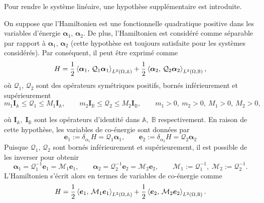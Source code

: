 Pour rendre le système linéaire, une hypothèse supplémentaire est introduite.
\begin{hypothese}\label{ass:quadHam_fr}
On suppose que l'Hamiltonien est une fonctionnelle quadratique positive dans les variables d'énergie $\bm{\alpha}_1, \, \bm{\alpha}_2 $. De plus, l'Hamiltonien est considéré comme séparable par rapport à $\bm{\alpha}_1, \, \bm{\alpha}_2 $ (cette hypothèse est toujours satisfaite pour les systèmes considérés). Par conséquent, il peut être exprimé comme
\begin{equation*}
H = \frac{1}{2} \inner[L^2(\Omega, \mathbb{A})]{\bm{\alpha}_{1}}{\mathcal{Q}_1\bm{\alpha}_{1}} + \frac{1}{2} \inner[L^2(\Omega, \mathbb{B})]{\bm{\alpha}_{2}}{\mathcal{Q}_2\bm{\alpha}_{2}},
\end{equation*}
où $ \mathcal{Q}_1, \, \mathcal{Q}_2 $ sont des opérateurs symétriques positifs, bornés inférieurement et supérieurement
\begin{equation*}
m_1 \bm{I}_\mathbb{A} \le\mathcal{Q}_1 \le M_1 \bm{I}_\mathbb{A}, \qquad  m_2 \bm{I}_\mathbb{B} \le \mathcal{Q}_2 \le M_2 \bm{I}_\mathbb{B}, \qquad m_1>0, \ m_2>0, \ M_1>0, \ M_2>0,
\end{equation*} 
\end{hypothese}
où $\bm{I}_\mathbb{A}, \; \bm{I}_\mathbb{B}$ sont les opérateurs d'identité dans $\mathbb{A}, \; \mathbb{B}$ respectivement. En raison de cette hypothèse, les variables de co-énergie sont données par
\begin{equation*}
\bm{e}_1 := \delta_{\alpha_1} H = \mathcal{Q}_1 \bm{\alpha}_1, \qquad \bm{e}_2 := \delta_{\alpha_2} H = \mathcal{Q}_2 \bm{\alpha}_2
\end{equation*}
Puisque $\mathcal{Q}_1, \, \mathcal{Q}_2 $ sont bornés inférieurement et supérieurement, il est possible de les inverser pour obtenir
\begin{equation*}
\bm{\alpha}_1 = \mathcal{Q}_1^{-1}\bm{e}_1 = \mathcal{M}_1\bm{e}_1, \qquad  \bm{\alpha}_2 = \mathcal{Q}_2^{-1} \bm{e}_2 = \mathcal{M}_2 \bm{e}_2, \qquad \mathcal{M}_1 := \mathcal{Q}_1^{-1}, \; \mathcal{M}_2 := \mathcal{Q}_2^{-1}.
\end{equation*}
L'Hamiltonien s'écrit alors en termes de variables de co-énergie comme
\begin{equation*}
H = \frac{1}{2} \inner[L^2(\Omega, \mathbb{A})]{\bm{e}_{1}}{\mathcal{M}_1\bm{e}_{1}} + \frac{1}{2} \inner[L^2(\Omega, \mathbb{B})]{\bm{e}_{2}}{\mathcal{M}_2\bm{e}_{2}}.
\end{equation*}

